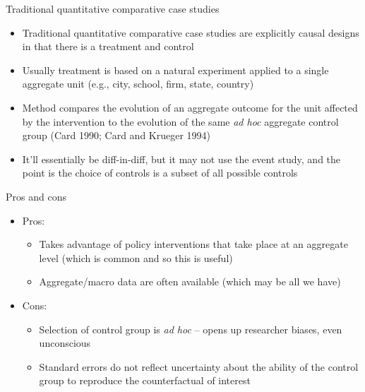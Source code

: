 \documentclass{beamer}
\begin{document}
\begin{frame}{Traditional quantitative comparative case studies}

\begin{itemize}
	\item Traditional quantitative comparative case studies are explicitly causal designs in that there is a treatment and control
	\item Usually treatment is based on a natural experiment applied to a single aggregate unit (e.g., city, school, firm, state, country)
	\item Method compares the evolution of an aggregate outcome for the unit affected by the intervention to the evolution of the same \emph{ad hoc} aggregate control group (Card 1990; Card and Krueger 1994)
	\item It'll essentially be diff-in-diff, but it may not use the event study, and the point is the choice of controls is a subset of all possible controls
\end{itemize}

\end{frame}

\begin{frame}{Pros and cons}
	
	\begin{itemize}
	\item Pros:
		\begin{itemize}
		\item Takes advantage of policy interventions that take place at an aggregate level (which is common and so this is useful)
		\item Aggregate/macro data are often available (which may be all we have)
		\end{itemize}
	\item Cons:
		\begin{itemize}
		\item Selection of control group is \emph{ad hoc} -- opens up researcher biases, even unconscious
		\item Standard errors do not reflect uncertainty about the ability of the control group to reproduce the counterfactual of interest
		\end{itemize}
	\end{itemize}
\end{frame}
\end{document}
